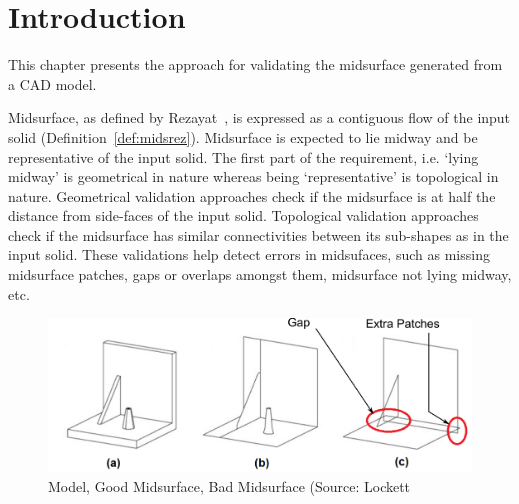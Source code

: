 

\section{Introduction}

This chapter presents the  approach for validating the midsurface generated from a CAD model. %


Midsurface, as defined by Rezayat~\cite{Rezayat1996}, is expressed as a contiguous flow of the input solid (Definition~\ref{def:midsrez}). Midsurface is expected to lie midway and be representative of the input solid. The first part of the requirement, i.e. `lying midway' is geometrical in nature whereas being `representative' is topological in nature. Geometrical validation approaches check if the midsurface is at half the distance from side-faces of the input solid. Topological validation approaches check if the midsurface has similar connectivities between its sub-shapes as in the input solid. These validations help detect errors in midsufaces, such as missing midsurface patches, gaps or overlaps amongst them, midsurface not lying midway, etc.



\begin{figure}[!h]
\centering     %
\includegraphics[width=0.8\linewidth,valign=t]{../Common/images/midslocketterrors.pdf}
\caption{Model, Good Midsurface, Bad Midsurface (Source: Lockett~\cite{Lockett2008}}
\label{fig:litsurvey:midslocketterrors}
\end{figure}

